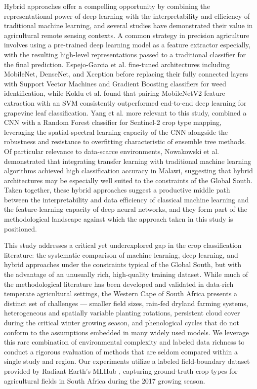 \documentclass[pdflatex,sn-mathphys]{sn-jnl} %
\begin{document}
Hybrid approaches offer a compelling opportunity by combining the representational power of deep learning with the interpretability and efficiency of traditional machine learning, and several studies have demonstrated their value in agricultural remote sensing contexts. A common strategy in precision agriculture involves using a pre-trained deep learning model as a feature extractor especially, with the resulting high-level representations passed to a traditional classifier for the final prediction. Espejo-Garcia et al. \cite{espejo2020} fine-tuned architectures including MobileNet, DenseNet, and Xception before replacing their fully connected layers with Support Vector Machines and Gradient Boosting classifiers for weed identification, while Koklu et al. \cite{koklu2022} found that pairing MobileNetV2 feature extraction with an SVM consistently outperformed end-to-end deep learning for grapevine leaf classification. Yang et al. \cite{yang2020} more relevant to this study, combined a CNN with a Random Forest classifier for Sentinel-2 crop type mapping, leveraging the spatial-spectral learning capacity of the CNN alongside the robustness and resistance to overfitting characteristic of ensemble tree methods. Of particular relevance to data-scarce environments, Nowakowski et al. \cite{nowakowski2021} demonstrated that integrating transfer learning with traditional machine learning algorithms achieved high classification accuracy in Malawi, suggesting that hybrid architectures may be especially well suited to the constraints of the Global South. Taken together, these hybrid approaches suggest a productive middle path between the interpretability and data efficiency of classical machine learning and the feature-learning capacity of deep neural networks, and they form part of the methodological landscape against which the approach taken in this study is positioned.
 
This study addresses a critical yet underexplored gap in the crop classification literature: the systematic comparison of machine learning, deep learning, and hybrid approaches under the constraints typical of the Global South, but with the advantage of an unusually rich, high-quality training dataset. While much of the methodological literature has been developed and validated in data-rich temperate agricultural settings, the Western Cape of South Africa presents a distinct set of challenges — smaller field sizes, rain-fed dryland farming systems, heterogeneous and spatially variable planting rotations, persistent cloud cover during the critical winter growing season, and phenological cycles that do not conform to the assumptions embedded in many widely used models.  We leverage this rare combination of environmental complexity and labeled data richness to conduct a rigorous evaluation of methods that are seldom compared within a single study and region. Our experiments utilize a labeled field-boundary dataset provided by Radiant Earth's MLHub \cite{mlhub}, capturing ground-truth crop types for agricultural fields in South Africa during the 2017 growing season. 
\end{document}
